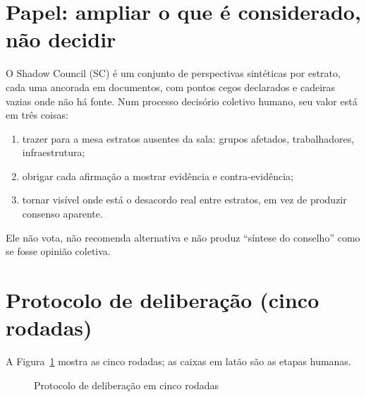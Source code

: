 \documentclass[12pt,a4paper,oneside,english,brazil]{abntex2}
\begin{document}
\section{Papel: ampliar o que é considerado, não decidir}
O Shadow Council (SC) é um conjunto de perspectivas sintéticas por estrato, cada uma ancorada em documentos, com pontos cegos declarados e cadeiras vazias onde não há fonte. Num processo decisório coletivo humano, seu valor está em três coisas:
\begin{enumerate}[leftmargin=*]
  \item trazer para a mesa estratos ausentes da sala: grupos afetados, trabalhadores, infraestrutura;
  \item obrigar cada afirmação a mostrar evidência e contra-evidência;
  \item tornar visível onde está o desacordo real entre estratos, em vez de produzir consenso aparente.
\end{enumerate}
Ele não vota, não recomenda alternativa e não produz ``síntese do conselho'' como se fosse opinião coletiva.

\section{Protocolo de deliberação (cinco rodadas)}
A Figura~\ref{fig:protocolo} mostra as cinco rodadas; as caixas em latão são as etapas humanas.

\begin{figure}[htbp]
\caption{Protocolo de deliberação em cinco rodadas}\label{fig:protocolo}
\centering
{}
\end{figure}
\end{document}
